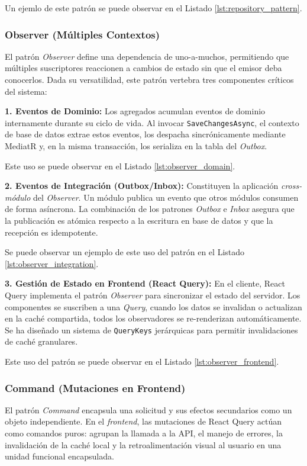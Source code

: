 Un ejemlo de este patrón se puede observar en el Listado \ref{lst:repository_pattern}.

\subsubsection{Observer (Múltiples Contextos)}
El patrón \emph{Observer} define una dependencia de uno-a-muchos, permitiendo que múltiples suscriptores reaccionen a cambios de estado sin que el emisor deba conocerlos. Dada su versatilidad, este patrón vertebra tres componentes críticos del sistema:

\textbf{1. Eventos de Dominio:} Los agregados acumulan eventos de dominio internamente durante su ciclo de vida. Al invocar \texttt{SaveChangesAsync}, el contexto de base de datos extrae estos eventos, los despacha sincrónicamente mediante MediatR y, en la misma transacción, los serializa en la tabla del \emph{Outbox}.

Este uso se puede observar en el Listado \ref{lst:observer_domain}.

\textbf{2. Eventos de Integración (Outbox/Inbox):} Constituyen la aplicación \emph{cross-módulo} del \emph{Observer}. Un módulo publica un evento que otros módulos consumen de forma asíncrona. La combinación de los patrones \emph{Outbox} e \emph{Inbox} asegura que la publicación es atómica respecto a la escritura en base de datos y que la recepción es idempotente.

Se puede observar un ejemplo de este uso del patrón en el Listado \ref{lst:observer_integration}.

\textbf{3. Gestión de Estado en Frontend (React Query):} En el cliente, React Query implementa el patrón \emph{Observer} para sincronizar el estado del servidor. Los componentes se suscriben a una \emph{Query}, cuando los datos se invalidan o actualizan en la caché compartida, todos los observadores se re-renderizan automáticamente. Se ha diseñado un sistema de \texttt{QueryKeys} jerárquicas para permitir invalidaciones de caché granulares.

Este uso del patrón se puede observar en el Listado \ref{lst:observer_frontend}.

\subsubsection{Command (Mutaciones en Frontend)}
El patrón \emph{Command} encapsula una solicitud y sus efectos secundarios como un objeto independiente. En el \emph{frontend}, las mutaciones de React Query actúan como comandos puros: agrupan la llamada a la \ac{API}, el manejo de errores, la invalidación de la caché local y la retroalimentación visual al usuario en una unidad funcional encapsulada.

